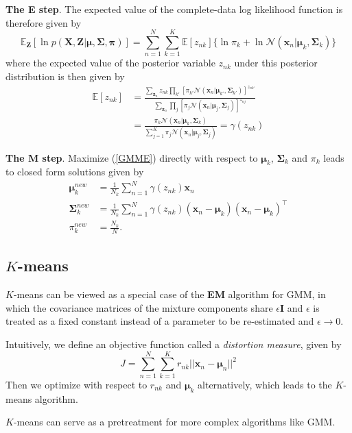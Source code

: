 \documentclass[a4paper]{report}
\renewcommand{\bf}{\mathbf}
\renewcommand{\cal}{\mathcal}
\newcommand{\bb}{\mathbb}
\newcommand{\imp}[1]{{\color{blue}\textit{#1}}}
\newcommand{\bs}{\boldsymbol}
\begin{document}
\textbf{The E step}. The expected value of the complete-data log likelihood function is therefore given by
\begin{equation}
	\bb{E}_{\bf{Z}}[\ln p(\bf{X,Z}|\bs{\mu,\Sigma,\pi})] = \sum_{n=1}^N \sum_{k=1}^K \bb{E}[z_{nk}]\{ \ln \pi_k + \ln \cal{N}(\bf{x}_n|\bs{\mu}_k,\bs{\Sigma}_k) \} \label{GMME}
\end{equation}
where the expected value of the posterior variable $z_{nk}$ under this posterior distribution is then given by
\begin{align}
	\bb{E}[z_{nk}] &= \frac{\sum_{\bf{z}_n} z_{nk}\prod_{k'}[ \pi_{k'} \cal{N}(\bf{x}_n|\bs{\mu}_{k'},\bs{\Sigma}_{k'})]^{z_{nk'}}}{\sum_{\bf{z}_n}\prod_j[\pi_j \cal{N}(\bf{x}_n|\bs{\mu}_j,\bs{\Sigma}_j)]^{z_{nj}}} \\
	&= \frac{\pi_k \cal{N}(\bf{x}_n|\bs{\mu}_k,\bs{\Sigma}_k)}{\sum_{j=1}^K \pi_j \cal{N}(\bf{x}_n|\bs{\mu}_j,\bs{\Sigma}_j)}=\gamma(z_{nk})
\end{align}

\textbf{The M step}. Maximize (\ref{GMME}) directly with respect to $\bs{\mu}_k$, $\bs{\Sigma}_k$ and $\pi_k$ leads to closed form solutions given by
\begin{align}
	\bs{\mu}_k^{new} &= \frac{1}{N_k} \sum_{n=1}^N \gamma(z_{nk})\bf{x}_n \\
	\bs{\Sigma}_k^{new} &= \frac{1}{N_k} \sum_{n=1}^N \gamma(z_{nk}) (\bf{x}_n - \bs{\mu}_k)(\bf{x}_n-\bs{\mu}_k)^{\intercal} \\
	\pi_k^{new} &= \frac{N_k}{N}.
\end{align}
\subsection{$K$-means}
$K$-means can be viewed as a special case of the \textbf{EM} algorithm for GMM, in which the covariance matrices of the mixture components share $\epsilon\bf{I}$ and $\epsilon$ is treated as a fixed constant instead of a parameter to be re-estimated and $\epsilon \rightarrow 0$. 

Intuitively, we define an objective function called a \imp{distortion measure}, given by
\begin{equation}
	J = \sum_{n=1}^N \sum_{k=1}^K r_{nk} || \bf{x}_n - \bs{\mu}_n||^2
\end{equation}
Then we optimize with respect to $r_{nk}$ and $\bs{\mu}_k$ alternatively, which leads to the $K$-means algorithm.

$K$-means can serve as a pretreatment for more complex algorithms like GMM.
\end{document}

